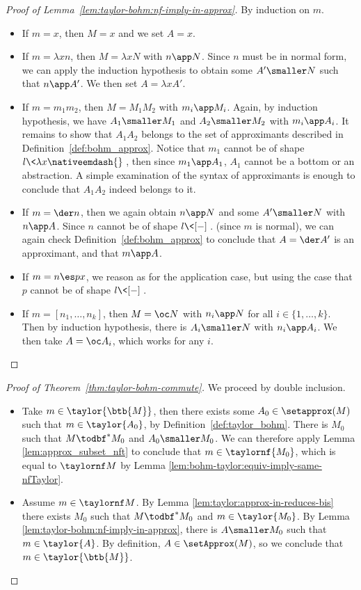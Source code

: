 \begin{proof}[Proof of Lemma~\ref{lem:taylor-bohm:nf-imply-in-approx}]
	By induction on $m$.
	\begin{itemize}
		\item If $m=x$, then $M=x$ and we set $A=x$.
		\item If $m=\lambda xn$, then $M=\lambda xN$ with $n\app N$.
			Since $n$ must be in normal form, we can apply the
			induction hypothesis to obtain some $A'\smaller N$
			such that $n\app A'$. We then set $A=\lambda xA'$.
		\item If $m=m_1m_2$, then $M=M_1M_2$ with $m_i\app M_i$. Again,
			by induction hypothesis, we have $A_1\smaller M_1$
			and $A_2\smaller M_2$ with $m_i\app A_i$. It remains
			to show that $A_1A_2$ belongs to the set of approximants
			described in Definition~\ref{def:bohm_approx}. Notice
			that $m_1$ cannot be of shape $l\<\lambda x\nativeemdash{}\>$, then since $m_1\app
			A_1$, $A_1$ cannot be a bottom or an abstraction. A
			simple examination of the syntax of approximants is
			enough to conclude that $A_1A_2$ indeed belongs to it.
		\item If $m=\der n$, then we again obtain $n\app N$ and some
			$A'\smaller N$ with $n\app A$. Since $n$ cannot be of
			shape $l\<[-]\>$.
			 (since $m$ is normal), we can again check
			Definition~\ref{def:bohm_approx} to conclude that $A=\der
			A'$ is an approximant, and that $m\app A$.
		\item If $m=n\es px$, we reason as for the application case, but
			using the case that $p$ cannot be of shape $l\<[-]\>$. 
		\item If $m=[n_1,\dots ,n_k]$, then $M=\oc N$ with $n_i\app N$ for
			all $i\in\{1,\dots ,k\}$. Then by induction hypothesis, there
			is $A_i\smaller N$ with $n_i\app A_i$. We then take
			$A=\oc A_i$, which works for any $i$.\qedhere
	\end{itemize}
\end{proof}


\begin{proof}[Proof of Theorem~\ref{thm:taylor-bohm-commute}]
We proceed by double inclusion.
\begin{itemize}
	\item Take $m \in \taylor{ \btb{M}}$, then there exists some $A_0\in\setapprox(M)$ such that
		$m \in \taylor{ A_0}$, by Definition~\ref{def:taylor_bohm}.
		There is $M_0$ such that $M \todbf^* M_0$ and $A_0 \smaller M_0$.
		We can therefore apply Lemma
		\ref{lem:approx_subset_nft} to conclude
		that $m \in \taylornf {M_0}$, which is
		equal to $\taylornf M$ by Lemma \ref{lem:bohm-taylor:equiv-imply-same-nfTaylor}.
	\item Assume $m \in \taylornf M$. By Lemma
		\ref{lem:taylor:approx-in-reduces-bis} there exists $M_0$ such
		that
		$M \todbf^* M_0$ and $m \in \taylor{M_0}$. By Lemma
		\ref{lem:taylor-bohm:nf-imply-in-approx}, there is $A\smaller
		M_0$ such that
		$m \in \taylor{ A}$. By definition, $A\in\setApprox(M)$, so we conclude that
		$m \in \taylor{ \btb{M}}$. \qedhere
\end{itemize}
\end{proof}

